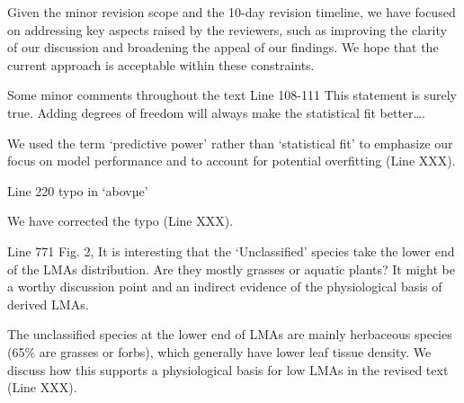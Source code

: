\documentclass[
  12pt,
  letterpaper,
  DIV=11,
  numbers=noendperiod]{scrartcl}
\renewenvironment{quote}
  {\begin{customblockquote}\color{blockquote-text}\ignorespaces}
  {\end{customblockquote}}
\begin{document}
Given the minor revision scope and the 10-day revision timeline, we have
focused on addressing key aspects raised by the reviewers, such as
improving the clarity of our discussion and broadening the appeal of our
findings. We hope that the current approach is acceptable within these
constraints.

\begin{quote}
Some minor comments throughout the text Line 108-111 This statement is
surely true. Adding degrees of freedom will always make the statistical
fit better\ldots.
\end{quote}

We used the term `predictive power' rather than `statistical fit' to
emphasize our focus on model performance and to account for potential
overfitting (Line XXX).

\begin{quote}
Line 220 typo in `abovµe'
\end{quote}

We have corrected the typo (Line XXX).

\begin{quote}
Line 771 Fig. 2, It is interesting that the `Unclassified' species take
the lower end of the LMAs distribution. Are they mostly grasses or
aquatic plants? It might be a worthy discussion point and an indirect
evidence of the physiological basis of derived LMAs.
\end{quote}

The unclassified species at the lower end of LMAs are mainly herbaceous
species (65\% are grasses or forbs), which generally have lower leaf
tissue density. We discuss how this supports a physiological basis for
low LMAs in the revised text (Line XXX).
\end{document}
